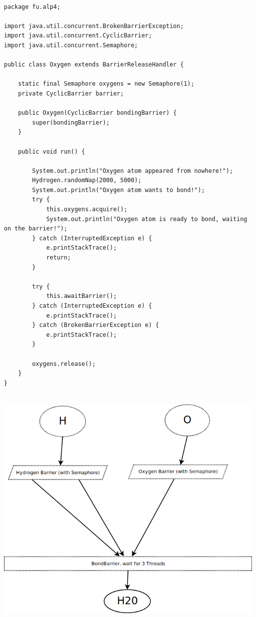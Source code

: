 \begin{lstlisting}[style=java]

package fu.alp4;

import java.util.concurrent.BrokenBarrierException;
import java.util.concurrent.CyclicBarrier;
import java.util.concurrent.Semaphore;

public class Oxygen extends BarrierReleaseHandler {

    static final Semaphore oxygens = new Semaphore(1);
    private CyclicBarrier barrier;

    public Oxygen(CyclicBarrier bondingBarrier) {
        super(bondingBarrier);
    }

    public void run() {

        System.out.println("Oxygen atom appeared from nowhere!");
        Hydrogen.randomNap(2000, 5000);
        System.out.println("Oxygen atom wants to bond!");
        try {
            this.oxygens.acquire();
            System.out.println("Oxygen atom is ready to bond, waiting on the barrier!");
        } catch (InterruptedException e) {
            e.printStackTrace();
            return;
        }

        try {
            this.awaitBarrier();
        } catch (InterruptedException e) {
            e.printStackTrace();
        } catch (BrokenBarrierException e) {
            e.printStackTrace();
        }

        oxygens.release();
    }
}


\end{lstlisting}

\includegraphics[width=\textwidth]{./exercise3/Diagram1.png}

